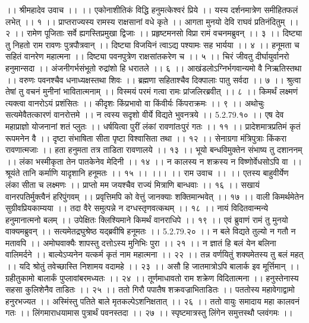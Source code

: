 ।। श्रीमहादेव उवाच ।। ।।
एकोनाशीतिकं विद्धि हनुमत्केश्वरं प्रिये ।।
यस्य दर्शनमात्रेण समीहितफलं लभेत् ।। १ ।।
प्राप्तराज्यस्य रामस्य राक्षसानां वधे कृते ।।
आगता मुनयो देवि राघवं प्रतिनंदितुम् ।। २ ।।
रामेण पूजिताः सर्वे ह्यगस्तिप्रमुखा द्विजाः ।।
प्रहृष्टमनसो विप्रा रामं वचनमब्रुवन् ।। ३ ।।
दिष्ट्या तु निहतो राम रावणः पुत्रपौत्रवान् ।।
दिष्ट्या विजयिनं त्वाऽद्य पश्यामः सह भार्यया ।। ४ ।।
हनूमता च सहितं वानरेण महात्मना ।।
दिष्ट्या पवनपुत्रेण राक्षसांतकरेण च ।। ५ ।।
चिरं जीवतु दीर्घायुर्वानरो हनुमान्सदा ।।
अंजनीगर्भसंभूतो रुद्रांशो हि धरातले ।। ६ ।।
आखंडलोऽग्निर्भगवान्यमो वै निऋतिस्तथा ।।
वरुणः पवनश्चैव धनाध्यक्षस्तथा शिवः ।।
ब्रह्मणा सहिताश्चैव दिक्पालाः पातु सर्वदा ।। ७ ।।
श्रुत्वा तेषां तु वचनं मुनीनां भावितात्मनाम् ।।
विस्मयं परमं गत्वा रामः प्रांजलिरब्रवीत् ।। ८ ।।
किमर्थं लक्ष्मणं त्यक्त्वा वानरोऽयं प्रशंसितः ।।
कीदृशः किंप्रभावो वा किंवीर्यः किंपराक्रमः ।। ९ ।।
अथोचुः सत्यमेवैतत्कारणं वानरोत्तमे ।।
न त्वस्य सदृशो वीर्ये विद्यते भुवनत्रये ।। 5.2.79.१० ।।
एष देव महाप्राज्ञो योजनानां शतं प्लुतः ।।
धर्षयित्वा पुरीं लंकां रावणांतःपुरं गतः ।। ११ ।।
प्रादेशमात्रप्रतिमं कृतं रूपमनेन वै ।।
दृष्टा संभाषिता सीता पृष्टा विश्वासिता तथा ।। १२ ।।
सेनाग्रगा मंत्रिपुत्राः किंकरा रावणात्मजाः ।।
हता हनुमता तत्र ताडिता रावणालये ।। १३ ।।
भूयो बन्धविमुक्तेन संभाष्य तु दशाननम् ।।
लंका भस्मीकृता तेन पातकेनेव मेदिनी ।। १४ ।।
न कालस्य न शक्रस्य न विष्णोर्वेधसोऽपि वा ।।
श्रूयंते तानि कर्माणि यादृशानि हनूमतः ।। १५ ।। ।।।
।। राम उवाच ।। ।।
एतस्य बाहुवीर्येण लंका सीता च लक्ष्मणः ।।
प्राप्तो मम जयश्चैव राज्यं मित्राणि बान्धवाः ।। १६ ।।
सखायं वानरपतिर्मुक्त्वैनं हरिपुंगवम् ।।
प्रवृत्तिमपि को वेत्तुं जानक्याः शक्तिमान्भवेत् ।। १७ ।।
वाली किमर्थमेतेन सुग्रीवप्रियकाम्यया ।।
तदा वैरे समुत्पन्ने न दग्धस्तृणवत्कथम् ।। १८ ।।
नायं विदितवान्मन्ये हनुमानात्मनो बलम् ।।
उपेक्षितः क्लिश्यिमाने किमर्थं वानराधिपे ।। १९ ।।
एवं ब्रुवाणं रामं तु मुनयो वाक्यमब्रुवन् ।।
सत्यमेतद्रघुश्रेष्ठ यद्ब्रवीषि हनूमतः ।। 5.2.79.२० ।।
न बले विद्यते तुल्यो न गतौ न मतावपि ।।
अमोघवाक्यैः शापस्तु दत्तोऽस्य मुनिभिः पुरा ।। २१ ।।
न ज्ञातं हि बलं येन बलिना वालिमर्दने ।।
बाल्येऽप्यनेन यत्कर्म कृतं नाम महात्मना ।। २२ ।।
तन्न वर्णयितुं शक्यमेतस्य तु बलं महत् ।।
यदि श्रोतुं तवेच्छास्ति निशामय वदामहे ।। २३ ।।
असौ हि जातमात्रोऽपि बालार्क इव मूर्त्तिमान् ।।
ग्रहीतुकामो बालार्कं पुप्लावांबरमध्यतः ।। २४ ।।
तूर्णमाधावतो राम शक्रेण विदितात्मना ।।
हनुस्तेनास्य सहसा कुलिशेनैव ताडितः ।। २५ ।।
ततो गिरौ पपातैष शक्रवज्राभिताडितः ।।
पततोस्य महावेगाद्वामो हनुरभज्यत ।।
अस्मिंस्तु पतिते बाले मृतकल्पेऽशनिक्षतात् ।। २६ ।।
ततो वायुः समादाय महा कालवनं गतः ।।
लिंगमाराधयामास पुत्रार्थं पवनस्तदा ।। २७ ।।
स्पृष्टमात्रस्तु लिंगेन समुत्तस्थौ प्लवंगमः ।।
